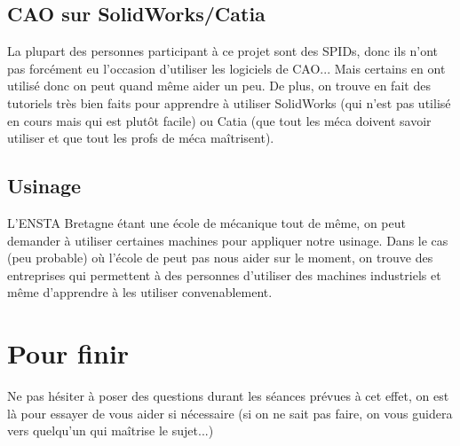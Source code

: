 \documentclass[fleqn,10pt]{SelfArx} %
\begin{document}
\subsection{CAO sur SolidWorks/Catia}

La plupart des personnes participant à ce projet sont des SPIDs, donc ils n'ont pas forcément eu l'occasion d'utiliser les logiciels de CAO... Mais certains en ont utilisé donc on peut quand même aider un peu. De plus, on trouve en fait des tutoriels très bien faits pour apprendre à utiliser SolidWorks (qui n'est pas utilisé en cours mais qui est plutôt facile) ou Catia (que tout les méca doivent savoir utiliser et que tout les profs de méca maîtrisent).

\subsection{Usinage}

L'ENSTA Bretagne étant une école de mécanique tout de même, on peut demander à utiliser certaines machines pour appliquer notre usinage. Dans le cas (peu probable) où l'école de peut pas nous aider sur le moment, on trouve des entreprises qui permettent à des personnes d'utiliser des machines industriels et même d'apprendre à les utiliser convenablement.


\section*{Pour finir} %


Ne pas hésiter à poser des questions durant les séances prévues à cet effet, on est là pour essayer de vous aider si nécessaire (si on ne sait pas faire, on vous guidera vers quelqu'un qui maîtrise le sujet...)


\end{document}
